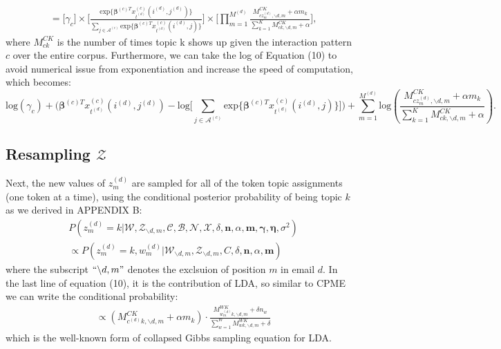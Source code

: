 \documentclass[a4paper]{article}
\begin{document}
   \begin{equation}
   \begin{aligned} &=\Big[ \gamma_{c}\Big]\times\Big[ \frac{\mbox{exp}\{\boldsymbol{\beta}^{(c)T}x^{(c)}_{t^{(d)}}(i^{(d)}, j^{(d)})\}}{\sum_{j\in \mathcal{A}^{(c)}} \mbox{exp}\{\boldsymbol{\beta}^{(c)T}x^{(c)}_{t^{(d)}}(i^{(d)}, j)\}}\Big]\times\Big[\prod_{m=1}^{M^{(d)}}
    \frac{M^{CK}_{cz_m^{(d)}, \backslash d, m}+\alpha m_k}{\sum_{k=1}^KM^{CK}_{ck, \backslash d, m}+\alpha}\Big],
   \end{aligned}
   \end{equation}
where $M^{CK}_{ck}$ is the number of times topic k shows up given the interaction pattern $c$ over the entire corpus. Furthermore, we can take the log of Equation (10) to avoid numerical issue from exponentiation and increase the speed of computation, which becomes:
  	 \begin{equation}
\mbox{log}(\gamma_{c})+\Big(\boldsymbol{\beta}^{(c)T}x^{(c)}_{t^{(d)}}(i^{(d)}, j^{(d)})-\mbox{log}\big[\sum_{j\in \mathcal{A}^{(c)}}\mbox{exp}\{\boldsymbol{\beta}^{(c)T}x^{(c)}_{t^{(d)}}(i^{(d)}, j)\}\big]\Big)+\sum_{m=1}^{M^{(d)}}\mbox{log}(\frac{M^{CK}_{cz_m^{(d)}, \backslash d, m}+\alpha m_k}{\sum_{k=1}^KM^{CK}_{ck, \backslash d, m}+\alpha}).
  	 \end{equation}
  \subsection{Resampling $\mathcal{Z}$}
Next, the new values of $z^{(d)}_m$ are sampled for all of the token topic assignments (one token at a time), using the conditional posterior probability of being topic $k$ as we derived in APPENDIX B:
\begin{equation}
\begin{aligned} & 
 P(z^{(d)}_m=k|\mathcal{W}, \mathcal{Z}_{\backslash d, m},  \mathcal{C}, \mathcal{B}, \mathcal{N}, \mathcal{X}, \delta, \boldsymbol{n}, \alpha, \boldsymbol{m}, \boldsymbol{\gamma}, \boldsymbol{\eta}, \sigma^2)\\
& \propto P(z^{(d)}_m=k, w^{(d)}_m|\mathcal{W}_{\backslash d, m}, \mathcal{Z}_{\backslash d,m}, C, \delta, \boldsymbol{n}, \alpha, \boldsymbol{m})
\end{aligned}
\end{equation}
where the subscript $``{\backslash d, m}"$ denotes the exclsuion of position $m$ in email $d$. In the last line of equation (10), it is the contribution of LDA, so similar to CPME we can write the conditional probability:
	\begin{equation}
	\begin{aligned} 
	& \propto(M^{CK}_{c^{(d)}k, \backslash d, m}+\alpha m_k)\cdot\frac{M_{w_m^{(d)}k, \backslash d, m}^{WK}+\delta n_w}{\sum_{w=1}^WM_{wk,  \backslash d, m}^{WK}+\delta}
	\end{aligned}
	\end{equation}
	which is the well-known form of collapsed Gibbs sampling equation for LDA.
\end{document}
